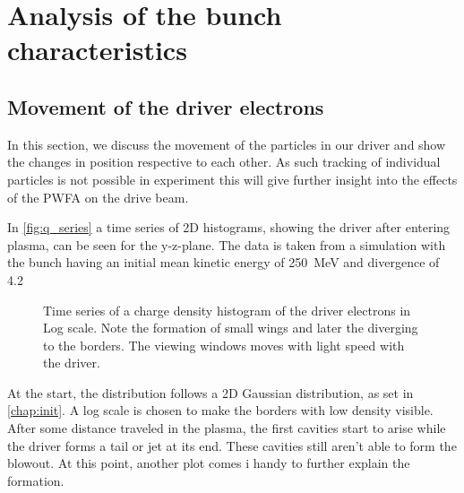 \documentclass[bachelor_thesis]{subfiles}
\begin{document}
\chapter{Analysis of the bunch characteristics}
\section{Movement of the driver electrons}
In this section, we discuss the movement of the particles in our driver and show the changes in position respective to each other. As such tracking of individual particles is not possible in experiment
this will give further insight into the effects of the \gls{PWFA} on the drive beam.

In \autoref{fig:q_series} a time series of 2D histograms, showing the driver after entering plasma, can be seen for the y-z-plane. The data is taken from a simulation with the bunch having an initial mean kinetic energy of \qty{250}{\MeV} and divergence of \qty{4.2}{\mrad} 
\begin{figure}
	\centering
	\missingfigure{}
	\caption{Time series of a charge density histogram of the driver electrons in Log scale. Note the formation of small wings and later the diverging to the borders. The viewing windows moves with light speed with the driver.}
	\label{fig:q_series}
\end{figure}
At the start, the distribution follows a 2D Gaussian distribution, as set in \autoref{chap:init}. A log scale is chosen to make the borders with low density visible. After some distance traveled in the plasma, 
the first cavities start to arise while the driver forms a tail or jet at its end. These cavities still aren't able to form the blowout. At this point, another plot comes i handy to further explain the formation.
\end{document}
